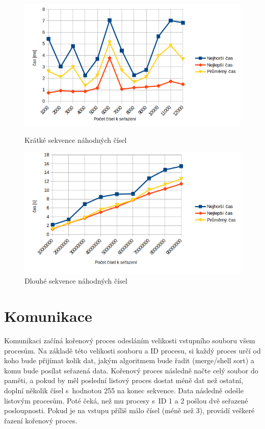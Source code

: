 \documentclass[11pt,a4paper,titlepage]{article}
\begin{document}
        \begin{figure}[htbp]
            \begin{minipage}{.5\textwidth}
                \centering
                \includegraphics[width=1\linewidth]{small.png}
                \caption{Krátké sekvence náhodných čísel}
            \end{minipage}
            \begin{minipage}{.5\textwidth}
                \centering
                \includegraphics[width=1\linewidth]{big_numbers.png}
                \caption{Dlouhé sekvence náhodných čísel}
            \end{minipage}
        \end{figure}

	\section{Komunikace}
        Komunikaci začíná kořenový proces odesláním velikosti vstupního souboru všem procesům. Na základě této velikosti souboru a ID procesu, si každý
        proces určí od koho bude přijímat kolik dat, jakým algoritmem bude řadit (merge/shell sort) a komu bude posílat seřazená data. Kořenový proces
        následně načte celý soubor do paměti,  a pokud by měl poslední listový proces dostat
        méně dat než ostatní, doplní několik čísel s~hodnotou 255 na konec sekvence. Data následně odešle listovým procesům. Poté čeká, než mu procesy s~ID 1 a 2
        pošlou dvě seřazené posloupnosti. Pokud je na vstupu příliš málo čísel (méně než 3), provádí veškeré řazení kořenový proces.
\end{document}
